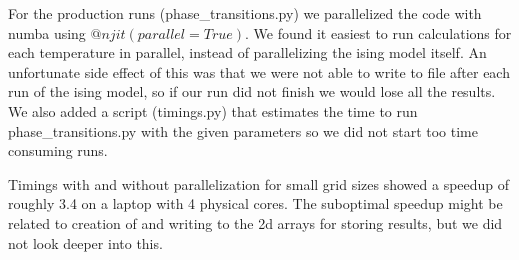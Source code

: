 For the production runs (phase\_transitions.py) we parallelized the code with
numba using $@njit(parallel=True)$. We found it easiest to run calculations for
each temperature in parallel, instead of parallelizing the ising model itself.
An unfortunate side effect of this was that we were not able to write to file
after each run of the ising model, so if our run did not finish we would lose
all the results. We also added a script (timings.py) that estimates the time to
run phase\_transitions.py with the given parameters so we did not start too time
consuming runs.

Timings with and without parallelization for small grid sizes showed a speedup
of roughly 3.4 on a laptop with 4 physical cores. The suboptimal speedup might
be related to creation of and writing to the 2d arrays for storing results,
but we did not look deeper into this.
